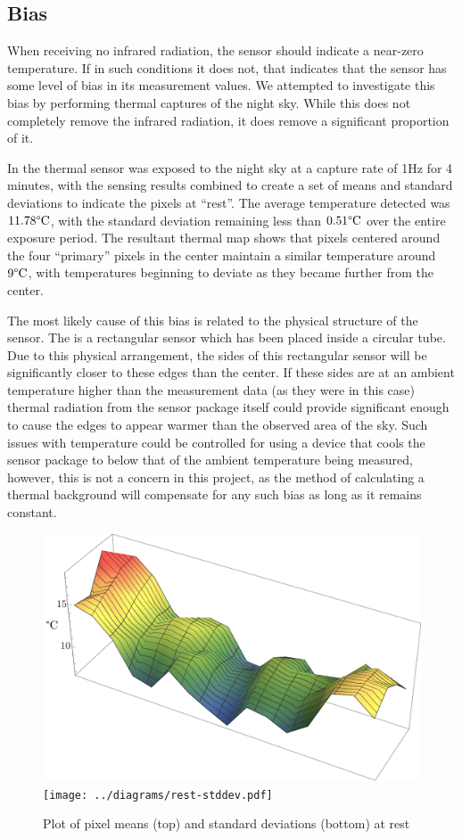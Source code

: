 \documentclass[../thesis/thesis.tex]{subfiles}
\begin{document}
\subsection{Bias}
When receiving no infrared radiation, the sensor should indicate a near-zero temperature. If in such conditions it does not, that indicates that the sensor has some level of bias in its measurement values. We attempted to investigate this bias by performing thermal captures of the night sky. While this does not completely remove the infrared radiation, it does remove a significant proportion of it.

In  the thermal sensor was exposed to the night sky at a capture rate of 1Hz for 4 minutes, with the sensing results combined to create a set of means and standard deviations to indicate the pixels at ``rest''. The average temperature detected was $11.78\degree\textrm{C}$, with the standard deviation remaining less than $0.51\degree\textrm{C}$ over the entire exposure period. The resultant thermal map shows that pixels centered around the four ``primary'' pixels in the center maintain a similar temperature around $9\degree\textrm{C}$, with temperatures beginning to deviate as they became further from the center.

The most likely cause of this bias is related to the physical structure of the sensor. The \mlx is a rectangular sensor which has been placed inside a circular tube. Due to this physical arrangement, the sides of this rectangular sensor will be significantly closer to these edges than the center. If these sides are at an ambient temperature higher than the measurement data (as they were in this case) thermal radiation from the sensor package itself could provide significant enough to cause the edges to appear warmer than the observed area of the sky. Such issues with temperature could be controlled for using a device that cools the sensor package to below that of the ambient temperature being measured, however, this is not a concern in this project, as the method of calculating a thermal background will compensate for any such bias as long as it remains constant.

\begin{figure}
\centering
\includegraphics[width=\textwidth]{../diagrams/rest-avg.pdf}
\texttt{[image: ../diagrams/rest-stddev.pdf]}
\caption{Plot of pixel means (top) and standard deviations (bottom) at rest}
\label{fig:meanstdplot}
\end{figure}
\end{document}

